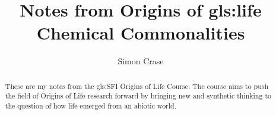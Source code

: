 \documentclass[]{article}
\title{Notes from Origins of \gls{gls:life}\\Chemical Commonalities}
\author{Simon Crase}
\begin{document}
\maketitle

\begin{abstract}
    These are my notes from the \gls{gls:SFI} Origins of Life Course\cite{sfi2019}. The course aims to push the field of Origins of Life research forward by bringing new and synthetic thinking to the question of how life emerged from an abiotic world.

\end{abstract}

\setcounter{tocdepth}{2}
\tableofcontents







\printglossaries

 


\end{document}
